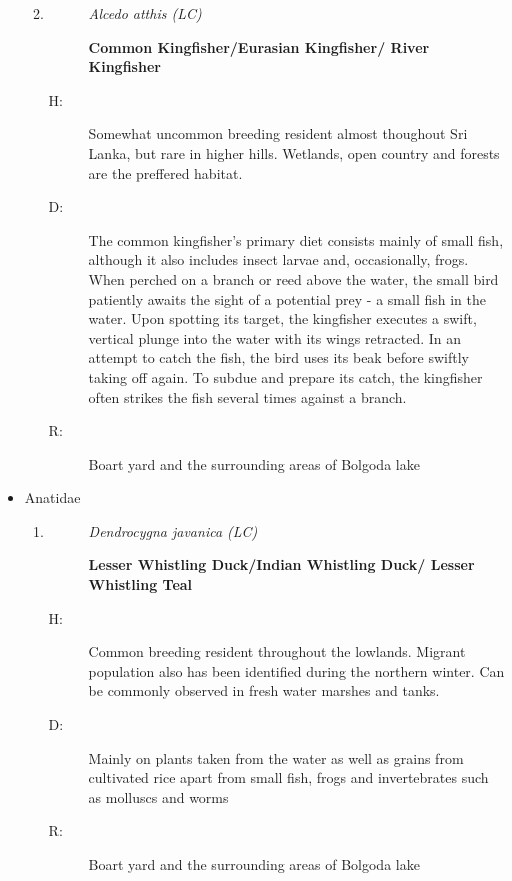 \begin{itemize}
\begin{enumerate}
\begin{description}
\end{description}%
\item%
\begin{description}%
\item[]%
\textit{Alcedo atthis (LC)}%
\item[]%
\textbf{Common Kingfisher/Eurasian Kingfisher/ River Kingfisher}%
\end{description}%
\begin{description}%
\item[H: ]%
Somewhat uncommon breeding resident almost thoughout Sri Lanka, but rare in higher hills. Wetlands, open country and forests are the preffered habitat.%
\item[D: ]%
The common kingfisher's primary diet consists mainly of small fish, although it also includes insect larvae and, occasionally, frogs. When perched on a branch or reed above the water, the small bird patiently awaits the sight of a potential prey {-} a small fish in the water. Upon spotting its target, the kingfisher executes a swift, vertical plunge into the water with its wings retracted. In an attempt to catch the fish, the bird uses its beak before swiftly taking off again. To subdue and prepare its catch, the kingfisher often strikes the fish several times against a branch.%
\item[R: ]%
Boart yard and the surrounding areas of Bolgoda lake%
\end{description}%
\end{enumerate}%
\item%
Anatidae%
\begin{enumerate}%
\item%
\begin{description}%
\item[]%
\textit{Dendrocygna javanica (LC)}%
\item[]%
\textbf{Lesser Whistling Duck/Indian Whistling Duck/ Lesser Whistling Teal}%
\end{description}%
\begin{description}%
\item[H: ]%
Common breeding resident throughout the lowlands. Migrant population also has been identified during the northern winter. Can be commonly observed in fresh water marshes and tanks.%
\item[D: ]%
Mainly on plants taken from the water as well as grains from cultivated rice apart from small fish, frogs and invertebrates such as molluscs and worms%
\item[R: ]%
Boart yard and the surrounding areas of Bolgoda lake%

\end{description}
\end{enumerate}
\end{itemize}
